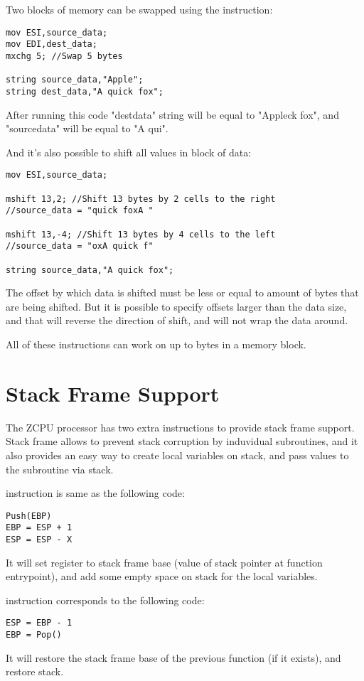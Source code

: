 Two blocks of memory can be swapped using the  instruction:
\begin{verbatim}
mov ESI,source_data;
mov EDI,dest_data;
mxchg 5; //Swap 5 bytes

string source_data,"Apple";
string dest_data,"A quick fox";
\end{verbatim}
After running this code "dest\textunderscore data" string will be equal to "Appleck fox", and "source\textunderscore data" will be equal to "A qui".

And it's also possible to shift all values in block of data:
\begin{verbatim}
mov ESI,source_data;

mshift 13,2; //Shift 13 bytes by 2 cells to the right
//source_data = "quick foxA "

mshift 13,-4; //Shift 13 bytes by 4 cells to the left
//source_data = "oxA quick f"

string source_data,"A quick fox";
\end{verbatim}

The offset by which data is shifted must be less or equal to amount of bytes that are being shifted. But it is possible to specify offsets larger than the data size, and that will reverse the direction of shift, and will not wrap the data around.

All of these instructions can work on up to  bytes in a memory block.

\section{Stack Frame Support}
The ZCPU processor has two extra instructions to provide stack frame support. Stack frame allows to prevent stack corruption by induvidual subroutines, and it also provides an easy way to create local variables on stack, and pass values to the subroutine via stack.

 instruction is same as the following code:
\begin{verbatim}
Push(EBP)
EBP = ESP + 1
ESP = ESP - X
\end{verbatim}
It will set  register to stack frame base (value of stack pointer at function entrypoint), and add some empty space on stack for the local variables.

 instruction corresponds to the following code:
\begin{verbatim}
ESP = EBP - 1
EBP = Pop()
\end{verbatim}
It will restore the stack frame base of the previous function (if it exists), and restore stack.

